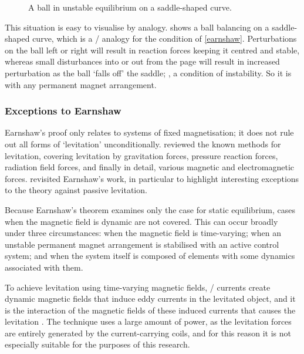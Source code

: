 \documentclass[11pt,a4paper]{memoir}
\begin{document}
\begin{figure}
  \caption{A ball in unstable equilibrium on a saddle-shaped curve.}
\end{figure}

This situation is easy to visualise by analogy.
 shows a ball balancing on a saddle-shaped curve, which is a \twoD/ analogy for the condition of \eqref{earnshaw}.
Perturbations on the ball left or right will result in reaction forces keeping it centred and stable, whereas small disturbances into or out from the page will result in increased perturbation as the ball `falls off' the saddle; \ie, a condition of instability.
So it is with any permanent magnet arrangement.


\subsubsection{Exceptions to Earnshaw}

Earnshaw's proof only relates to systems of fixed magnetisation; it does not rule out all forms of `levitation' unconditionally.
\textcite{boerdijk1956a} reviewed the known methods for levitation, covering levitation by gravitation forces, pressure reaction forces, radiation field forces, and finally in detail, various magnetic and electromagnetic forces.
\textcite{bassani2006-meccanica} revisited Earnshaw's work, in particular to highlight interesting exceptions to the theory against passive levitation.

Because Earnshaw's theorem examines only the case for static equilibrium, cases when the magnetic field is dynamic are not covered.
This can occur broadly under three circumstances: when the magnetic field is time-varying; when an unstable permanent magnet arrangement is stabilised with an active control system; and when the system itself is composed of elements with some dynamics associated with them.

To achieve levitation using time-varying magnetic fields, \AC/ currents create dynamic magnetic fields that induce eddy currents in the levitated object, and it is the interaction of the magnetic fields of these induced currents that causes the levitation \cite{laithwaite1965}.
The technique uses a large amount of power, as the levitation forces are entirely generated by the current-carrying coils, and for this reason it is not especially suitable for the purposes of this research.
\end{document}
